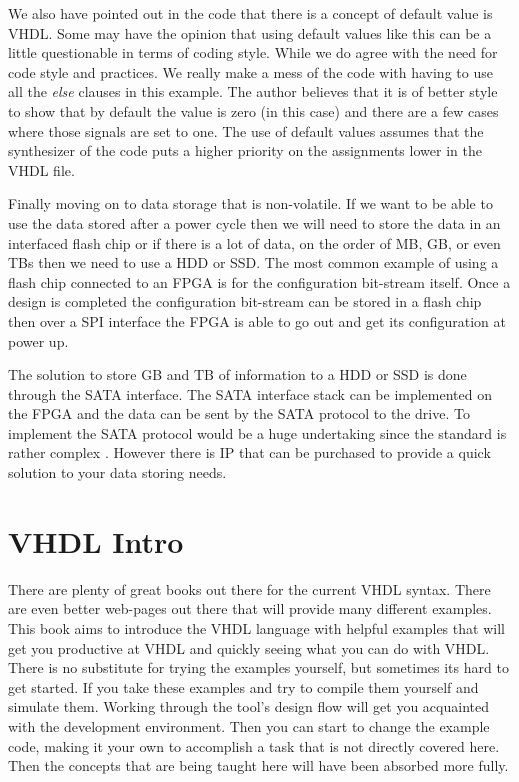 We also have pointed out in the code that there is a concept of default value is \ac{VHDL}. Some may have the opinion that using default values like this can be a little questionable in terms of coding style. While we do agree with the need for code style and practices. We really make a mess of the code with having to use all the \emph{else} clauses in this example. The author believes that it is of better style to show that by default the value is zero (in this case) and there are a few cases where those signals are set to one. The use of default values assumes that the synthesizer of the code puts a higher priority on the assignments lower in the \ac{VHDL} file. 

Finally moving on to data storage that is non-volatile. If we want to be able to use the data stored after a power cycle then we will need to store the data in an interfaced flash chip or if there is a lot of data, on the order of \ac{MB}, \ac{GB}, or even \ac{TB}s then we need to use a \ac{HDD} or \ac{SSD}. The most common example of using a flash chip connected to an \ac{FPGA} is for the configuration bit-stream itself. Once a design is completed the configuration bit-stream can be stored in a flash chip then over a \ac{SPI} interface the \ac{FPGA} is able to go out and get its configuration at power up. 

The solution to store \ac{GB} and \ac{TB} of information to a \ac{HDD} or \ac{SSD} is done through the \ac{SATA} interface. The \ac{SATA} interface stack can be implemented on the \ac{FPGA} and the data can be sent by the \ac{SATA} protocol to the drive. To implement the \ac{SATA} protocol would be a huge undertaking since the standard is rather complex \cite{sata_std}. However there is \ac{IP} that can be purchased to provide a quick solution to your data storing needs. 	
	
\section{VHDL Intro}
	
There are plenty of great books out there for the current \ac{VHDL} syntax. There are even better web-pages out there that will provide many different examples. This book aims to introduce the \ac{VHDL} language with helpful examples that will get you productive at \ac{VHDL} and quickly seeing what you can do with \ac{VHDL}. There is no substitute for trying the examples yourself, but sometimes its hard to get started. If you take these examples and try to compile them yourself and simulate them. Working through the tool's design flow will get you acquainted with the development environment. Then you can start to change the example code, making it your own to accomplish a task that is not directly covered here. Then the concepts that are being taught here will have been absorbed more fully.

